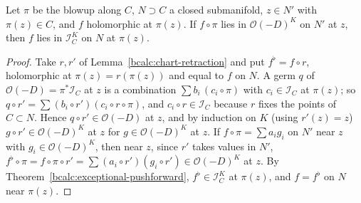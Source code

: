 \begin{theorem}
\label{bcalc:exceptional-pushforward-along}
\leanok
Let \(\pi\) be the blowup along \(C\), \(N\supset C\) a closed submanifold, \(z\in N'\) with \(\pi(z)\in C\), and \(f\) holomorphic at \(\pi(z)\). If \(f\circ\pi\)
lies in \(\mathcal O(-D)^K\) on \(N'\) at \(z\), then \(f\) lies in \(\mathcal I_C^K\) on \(N\) at \(\pi(z)\).
\end{theorem}
\begin{proof}
\leanok
Take \(r,r'\) of Lemma~\ref{bcalc:chart-retraction} and put \(f^\flat=f\circ r\), holomorphic at \(\pi(z)=r(\pi(z))\) and equal to \(f\) on \(N\). A germ \(q\) of
\(\mathcal O(-D)=\pi^*\mathcal I_C\) at \(z\) is a combination \(\sum b_i\,(c_i\circ\pi)\) with \(c_i\in\mathcal I_C\) at \(\pi(z)\); so
\(q\circ r'=\sum(b_i\circ r')(c_i\circ r\circ\pi)\), and \(c_i\circ r\in\mathcal I_C\) because \(r\) fixes the points of \(C\subset N\). Hence \(q\circ r'\in\mathcal O(-D)\) at
\(z\), and by induction on \(K\) (using \(r'(z)=z\)) \(g\circ r'\in\mathcal O(-D)^K\) at \(z\) for \(g\in\mathcal O(-D)^K\) at \(z\). If \(f\circ\pi=\sum a_ig_i\) on
\(N'\) near \(z\) with \(g_i\in\mathcal O(-D)^K\), then near \(z\), since \(r'\) takes values in \(N'\),
\(f^\flat\circ\pi=f\circ\pi\circ r'=\sum(a_i\circ r')(g_i\circ r')\in\mathcal O(-D)^K\) at \(z\). By Theorem~\ref{bcalc:exceptional-pushforward},
\(f^\flat\in\mathcal I_C^K\) at \(\pi(z)\), and \(f=f^\flat\) on \(N\) near \(\pi(z)\).
\end{proof}

